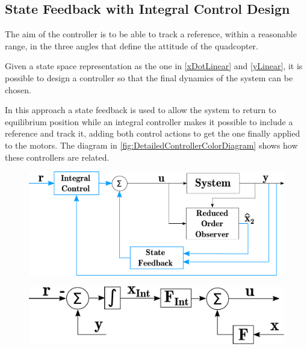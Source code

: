 \subsection{State Feedback with Integral Control Design}
The aim of the controller is to be able to track a reference, within a reasonable range, in the three angles that define the attitude of the quadcopter.

Given a state space representation as the one in \autoref{xDotLinear} and \ref{yLinear}, it is possible to design a controller so that the final dynamics of the system can be chosen.

In this approach a state feedback is used to allow the system to return to equilibrium position while an integral controller makes it possible to include a reference and track it, adding both control actions to get the one finally applied to the motors. The diagram in \autoref{fig:DetailedControllerColorDiagram} shows how these controllers are related.
%
\begin{minipage}{\linewidth}
	\begin{minipage}{0.6\linewidth}
		\begin{figure}[H]
			\includegraphics[scale=.35]{figures/ControllerColorDiagram}
			\centering			
			\label{fig:ControllerColorDiagram}
		\end{figure}
	\end{minipage}
	\hspace{0.03\linewidth}
	\begin{minipage}{0.4\linewidth}
		\begin{figure}[H]\vspace{20mm}
			\includegraphics[scale=.35]{figures/DetailedControllerColorDiagram}
			\centering \vspace{7mm}
			\label{fig:DetailedControllerColorDiagram}
		\end{figure}
	\end{minipage}
\end{minipage}


